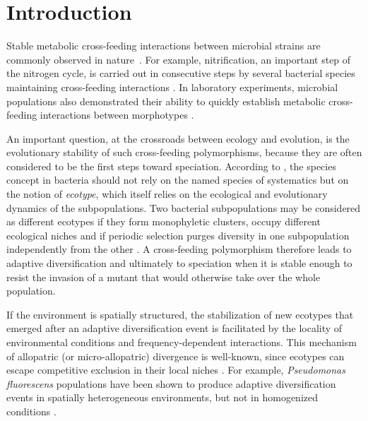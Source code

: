 
\section{Introduction}
\label{sec:part2:first_result:introduction}

Stable metabolic cross-feeding interactions between microbial strains are commonly observed in nature~\citep{stams-1994,dejonghe-et-al-2003,costa-et-al-2006,katsuyama-et-al-2009}. For example, nitrification, an important step of the nitrogen cycle, is carried out in consecutive steps by several bacterial species maintaining cross-feeding interactions \citep{costa-et-al-2006}. In laboratory experiments, microbial populations also demonstrated their ability to quickly establish metabolic cross-feeding interactions between morphotypes \citep{rainey-travisano-1998,rainey-rainey-2003,helling-et-al-1987,rosenzweig-et-al-1994,turner-et-al-1996,treves-et-al-1998,rozen-et-al-2000,rozen-et-al-2005,rozen-et-al-2009}.

An important question, at the crossroads between ecology and evolution, is the evolutionary stability of such cross-feeding polymorphisms, because they are often considered to be the first steps toward speciation. According to \cite{cohan-2002}, the species concept in bacteria should not rely on the named species of systematics but on the notion of \textit{ecotype}, which itself relies on the ecological and evolutionary dynamics of the subpopulations. Two bacterial subpopulations may be considered as different ecotypes if they form monophyletic clusters, occupy different ecological niches and if periodic selection purges diversity in one subpopulation independently from the other \citep{cohan-2002}. A cross-feeding polymorphism therefore leads to adaptive diversification and ultimately to speciation when it is stable enough to resist the invasion of a mutant that would otherwise take over the whole population. 

If the environment is spatially structured, the stabilization of new ecotypes that emerged after an adaptive diversification event is facilitated by the locality of environmental conditions and frequency-dependent interactions. This mechanism of allopatric (or micro-allopatric) divergence is well-known, since ecotypes can escape competitive exclusion in their local niches \citep{cohan-2002}. For example, \textit{Pseudomonas fluorescens} populations have been shown to produce adaptive diversification events in spatially heterogeneous environments, but not in homogenized conditions \citep{rainey-travisano-1998,rainey-rainey-2003}.

